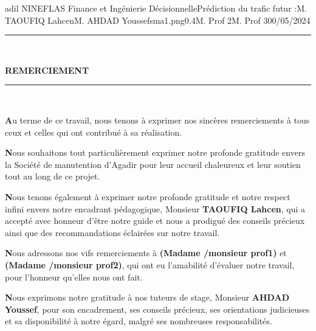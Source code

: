\documentclass[11pt]{article}
\begin{document}
{adil NINEFLAS} {Finance et Ingénierie Décisionnelle}{Prédiction du trafic futur :}{M. TAOUFIQ Lahcen}{M. AHDAD Youssef}{sma1.png}{0.4}{M. Prof 2}{M. Prof 3}{00/05/2024}

\newpage




\begin{center}
    {\color{cyan}\rule{\linewidth}{0.5mm}} \\[1.5ex]
    
    {\color{cyan}\Huge\bfseries REMERCIEMENT\par}
    
    {\color{cyan}\rule{\linewidth}{0.5mm}} \\[2ex]
    
\end{center}

\vspace{1cm}

\textbf{A}u terme de ce travail, nous tenons à exprimer nos sincères remerciements à tous ceux et celles qui ont contribué à sa réalisation.\vspace{0.5cm}


\textbf{N}ous souhaitons tout particulièrement exprimer notre profonde gratitude envers la Société de manutention d’Agadir pour leur accueil chaleureux et leur soutien tout au long de ce projet.\vspace{0.5cm}

\textbf{N}ous tenons également à exprimer notre profonde gratitude et notre respect infini envers notre encadrant pédagogique, Monsieur \textbf{TAOUFIQ Lahcen}, qui a accepté avec honneur d'être notre guide et nous a prodigué des conseils précieux ainsi que des recommandations éclairées sur notre travail.\vspace{0.5cm}

\textbf{N}ous adressons nos vifs remerciements à \textbf{(Madame /monsieur prof1)} et\textbf{ (Madame /monsieur prof2)}, qui ont eu l'amabilité d'évaluer notre travail, pour l'honneur qu'elles nous ont fait.\vspace{0.5cm}

\textbf{N}ous exprimons notre gratitude à nos tuteurs de stage, Monsieur\textbf{ AHDAD Youssef}, pour son encadrement, ses conseils précieux, ses orientations judicieuses et sa disponibilité à notre égard, malgré ses nombreuses responsabilités.\vspace{0.5cm}
\end{document}
